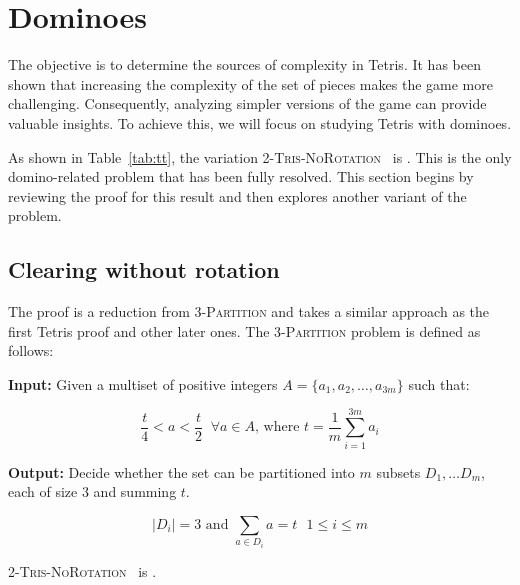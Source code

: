 \section{Dominoes}

The objective is to determine the sources of complexity in Tetris. It has been shown\cite{TT, TCB} that increasing the complexity of the set of pieces makes the game more challenging. Consequently, analyzing simpler versions of the game can provide valuable insights. To achieve this, we will focus on studying Tetris with dominoes.

As shown in Table~\ref{tab:tt}, the variation \textsc{2-{Tris-NoRotation}} \clearing\ is \npc\cite{TT}. This is the only domino-related problem that has been fully resolved. This section begins by reviewing the proof for this result and then explores another variant of the problem.

\subsection{Clearing without rotation}

The proof is a reduction from \textsc{3-Partition} and takes a similar approach as the first Tetris proof\cite{TIH} and other later ones\cite{TT, TWFP, TCB, CTV}. The \textsc{3-Partition} problem is defined as follows:

\textbf{Input:} Given a multiset of positive integers $A = \{ a_1, a_2, \dots, a_{3m} \}$ such that:

$$ \frac{t}{4} < a < \frac{t}{2}\;\; \forall a \in A \text{, where } t = \frac{1}{m} \sum_{i=1}^{3m} a_i $$ 

\textbf{Output:} Decide whether the set can be partitioned into $m$ subsets $D_1, \dots D_m$, each of size $3$ and summing $t$. 

$$ | D_i | = 3 \text{ and } \sum_{a \in D_i} a = t\text{   } 1 \leq i \leq m$$

\begin{theorem} 
  \textsc{2-{Tris-NoRotation}} \clearing\ is \npc.
\end{theorem}

